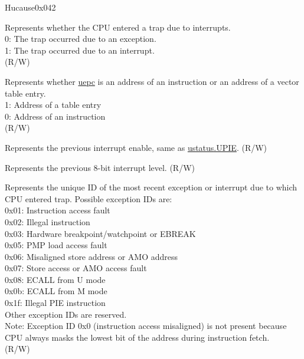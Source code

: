 \begin{register}{H}{ucause}{0x042}\label{regdesc:UCAUSE}
%
%
%
%
%
%
%
%
\regnewline%
\begin{regdesc}\begin{reglist}
\label{fielddesc:UCAUSEINT}\item [INT] Represents whether the CPU entered a trap due to interrupts. \\
0: The trap occurred due to an exception.\\
1: The trap occurred due to an interrupt.\\
(R/W)
\label{fielddesc:UCAUSE_UINHV}\item [UINHV] Represents whether \hyperref[fielddesc:UEPC]{uepc} is an address of an instruction or an address of a vector table entry.\\
1: Address of a table entry\\
0: Address of an instruction\\
(R/W)
\label{fielddesc:UCAUSE_UPIE}\item [UPIE] Represents the previous interrupt enable, same as \hyperref[fielddesc:USTATUSUPIE]{ustatus.UPIE}. (R/W)
\label{fielddesc:UCAUSE_UPIL}\item [UPIL] Represents the previous 8-bit interrupt level. (R/W)
\label{fielddesc:UCAUSECODE}\item [CODE] Represents the unique ID of the most recent exception or interrupt due to which CPU entered trap. Possible exception IDs are:\\
0x01: Instruction access fault\\
0x02: Illegal instruction\\
0x03: Hardware breakpoint/watchpoint or EBREAK\\
0x05: PMP load access fault\\
0x06: Misaligned store address or AMO address\\
0x07: Store access or AMO access fault\\
0x08: ECALL from U mode\\
0x0b: ECALL from M mode\\
0x1f: Illegal PIE instruction\\
Other exception IDs are reserved.\\
Note: Exception ID 0x0 (instruction access misaligned) is not present because CPU always masks the lowest bit of the address during instruction fetch.\\
(R/W)
\end{reglist}\end{regdesc}
\end{register}


